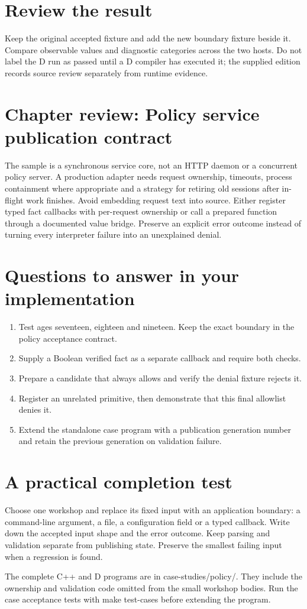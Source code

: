 \section*{Review the result}
Keep the original accepted fixture and add the new boundary fixture beside it. Compare observable values and diagnostic categories across the two hosts. Do not label the D run as passed until a D compiler has executed it; the supplied edition records source review separately from runtime evidence.

\clearpage
\section*{Chapter review: Policy service publication contract}
The sample is a synchronous service core, not an HTTP daemon or a concurrent policy server. A production adapter needs request ownership, timeouts, process containment where appropriate and a strategy for retiring old sessions after in-flight work finishes. Avoid embedding request text into source. Either register typed fact callbacks with per-request ownership or call a prepared function through a documented value bridge. Preserve an explicit error outcome instead of turning every interpreter failure into an unexplained denial.

\section*{Questions to answer in your implementation}
\begin{enumerate}
\item Test ages seventeen, eighteen and nineteen. Keep the exact boundary in the policy acceptance contract.
\item Supply a Boolean verified fact as a separate callback and require both checks.
\item Prepare a candidate that always allows and verify the denial fixture rejects it.
\item Register an unrelated primitive, then demonstrate that this final allowlist denies it.
\item Extend the standalone case program with a publication generation number and retain the previous generation on validation failure.
\end{enumerate}
\section*{A practical completion test}
Choose one workshop and replace its fixed input with an application boundary: a command-line argument, a file, a configuration field or a typed callback. Write down the accepted input shape and the error outcome. Keep parsing and validation separate from publishing state. Preserve the smallest failing input when a regression is found.

The complete C++ and D programs are in case-studies/policy/. They include the ownership and validation code omitted from the small workshop bodies. Run the case acceptance tests with make test-cases before extending the program.

